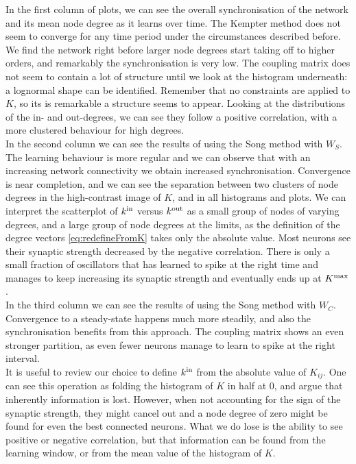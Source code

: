 In the first column of plots, we can see the overall synchronisation of the network and its mean node degree as it learns over time. The Kempter method does not seem to converge for any time period under the circumstances described before. We find the network right before larger node degrees start taking off to higher orders, and remarkably the synchronisation is very low.
The coupling matrix does not seem to contain a lot of structure until we look at the histogram underneath: a lognormal shape can be identified. Remember that no constraints are applied to $K$, so its is remarkable a structure seems to appear. Looking at the distributions of the in- and out-degrees, we can see they follow a positive correlation, with a more clustered behaviour for high degrees. \\

In the second column we can see the results of using the Song method with $W_S$. The learning behaviour is more regular and we can observe that with an increasing network connectivity we obtain increased synchronisation. Convergence is near completion, and we can see the separation between two clusters of node degrees in the high-contrast image of $K$, and in all histograms and plots. We can interpret the scatterplot of ${k^{\rm in}}$ versus ${k^{\rm out}}$ as a small group of nodes of varying degrees, and a large group of node degrees at the limits, as the definition of the degree vectors \eqref{eq:redefineFromK} takes only the absolute value. Most neurons see their synaptic strength decreased by the negative correlation. There is only a small fraction of oscillators that has learned to spike at the right time and manages to keep increasing its synaptic strength and eventually ends up at $K^{\rm max}$. \\%

In the third column we can see the results of using the Song method with $W_C$. Convergence to a steady-state happens much more steadily, and also the synchronisation benefits from this approach. The coupling matrix shows an even stronger partition, as even fewer neurons manage to learn to spike at the right interval.\\

It is useful to review our choice to define ${k^{\rm in}}$ from the absolute value of $K_{ij}$. One can see this operation as folding the histogram of $K$ in half at 0, and argue that inherently information is lost. However, when not accounting for the sign of the synaptic strength, they might cancel out and a node degree of zero might be found for even the best connected neurons. What we do lose is the ability to see positive or negative correlation, but that information can be found from the learning window, or from the mean value of the histogram of $K$.


